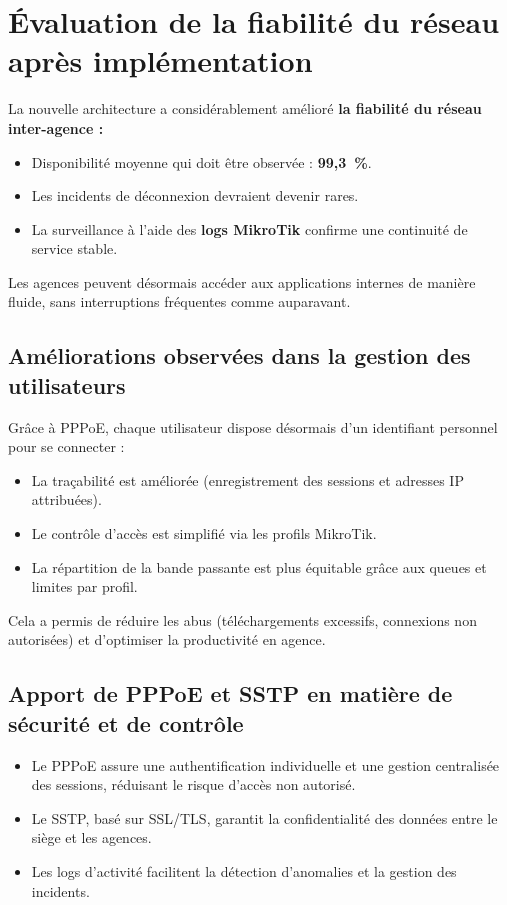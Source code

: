 \section{Évaluation de la fiabilité du réseau après implémentation }
La nouvelle architecture a considérablement amélioré \textbf{la fiabilité du réseau inter-agence :}  

\begin{itemize}
    \item Disponibilité moyenne qui doit être observée : \textbf{99,3~\%}.
    \item Les incidents de déconnexion devraient devenir rares.
    \item La surveillance à l’aide des \textbf{logs MikroTik} confirme une continuité de service stable.
\end{itemize}

Les agences peuvent désormais accéder aux applications internes de manière fluide, 
sans interruptions fréquentes comme auparavant.

\subsection{Améliorations observées dans la gestion des utilisateurs}

Grâce à \gls{PPPoE}, chaque utilisateur dispose désormais d’un identifiant personnel pour se connecter :  

\begin{itemize}
    \item La traçabilité est améliorée (enregistrement des sessions et adresses IP attribuées).
    \item Le contrôle d’accès est simplifié via les profils MikroTik.
    \item La répartition de la bande passante est plus équitable grâce aux queues et limites par profil.
\end{itemize}

Cela a permis de réduire les abus (téléchargements excessifs, connexions non autorisées) et d’optimiser la productivité en agence.

\subsection{Apport de PPPoE et SSTP en matière de sécurité et de contrôle}

\begin{itemize}
    \item Le \gls{PPPoE} assure une authentification individuelle et une gestion centralisée des sessions, réduisant le risque d’accès non autorisé.
    \item Le \gls{SSTP}, basé sur \gls{SSL}/\gls{TLS}, garantit la confidentialité des données entre le siège et les agences.
    \item Les logs d’activité facilitent la détection d’anomalies et la gestion des incidents.
\end{itemize}

